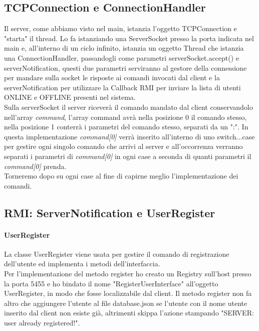 \documentclass[]{article}
\begin{document}
\subsection{TCPConnection e ConnectionHandler}
Il server, come abbiamo visto nel main, istanzia l'oggetto TCPConnection e "starta" il thread.
Lo fa istanziando una ServerSocket presso la porta indicata nel main e, all'interno di un ciclo infinito, istanzia un oggetto Thread che istanzia una ConnectionHandler, passandogli come parametri serverSocket.accept() e serverNotification, questi due parametri serviranno al gestore della connessione per mandare sulla socket le risposte ai comandi invocati dal client e la serverNotification per utilizzare la Callback RMI per inviare la lista di utenti ONLINE e OFFLINE presenti nel sistema.\\
Sulla serverSocket il server riceverà il comando mandato dal client conservandolo nell'array \textit{command}, l'array command avrà nella posizione 0 il comando stesso, nella posizione 1 conterrà i parametri del comando stesso, separati da un ":".
In questa implementazione \textit{command[0]} verrà inserito all'interno di uno switch...case per gestire ogni singolo comando che arrivi al server e all'occorrenza verranno separati i parametri di \textit{command[0]} in ogni case a seconda di quanti parametri il \textit{command[0]} prenda.\\
Torneremo dopo su ogni case al fine di capirne meglio l'implementazione dei comandi.
\subsection{RMI: ServerNotification e UserRegister}
\paragraph{UserRegister} La classe UserRegister viene usata per gestire il comando di registrazione dell'utente ed implementa i metodi dell'interfaccia. \\Per l'implementazione del metodo register ho creato un Registry sull'host presso la porta 5455 e ho bindato il nome "RegisterUserInterface" all'oggetto UserRegister, in modo che fosse localizzabile dal client. Il metodo register non fa altro che aggiungere l'utente al file database.json se l'utente con il nome utente inserito dal client non esiste già, altrimenti skippa l'azione stampando "SERVER: user already registered!".
\end{document}
